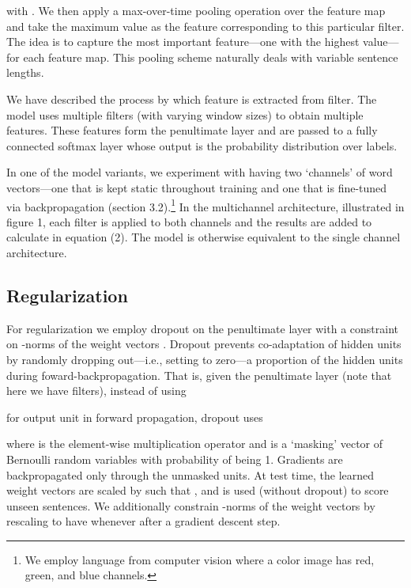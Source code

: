 \documentclass[11pt]{article}
\begin{document}
with . We then apply a max-over-time pooling operation \cite{Collobert:2011} over the feature map and take the maximum value  as the feature corresponding to this particular filter. The idea is to capture the most important feature---one with the highest value---for each feature map. This pooling scheme naturally deals with variable sentence lengths. 

We have described the process by which  feature is extracted from  filter. The model uses multiple filters (with varying window sizes) to obtain multiple features. These features form the penultimate layer and are passed to a fully connected softmax layer whose output is the probability distribution over labels.

In one of the model variants, we experiment with having two `channels' of word vectors---one that is kept static throughout training and one that is fine-tuned via backpropagation  (section 3.2).\footnote{We employ language from computer vision where a color image has red, green, and blue channels.} In the multichannel architecture, illustrated in figure 1, each filter is applied to both channels and the results are added to calculate  in equation (2). The model is otherwise equivalent to the single channel architecture.
\subsection{Regularization}
For regularization we employ dropout on the penultimate layer with a constraint on -norms of the weight vectors \cite{Hinton:2012}. Dropout prevents co-adaptation of hidden units by randomly dropping out---i.e., setting to zero---a proportion  of the hidden units during foward-backpropagation. That is, given the penultimate layer  (note that here we have  filters), instead of using

for output unit  in forward propagation, dropout uses

where  is the element-wise multiplication operator and  is a `masking' vector of Bernoulli random variables with probability  of being 1. Gradients are backpropagated only through the unmasked units. At test time, the learned weight vectors are scaled by  such that , and  is used (without dropout) to score unseen sentences. We additionally constrain -norms of the weight vectors by rescaling  to have  whenever  after a gradient descent step.
\end{document}
